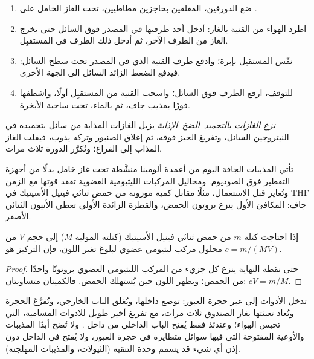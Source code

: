 \begin{method}\label{met:b3:lab-techniques-3:cannula}
\begin{enumerate}
  \item ضع الدورقين، المغلقين بحاجزين مطاطيين، تحت الغاز الخامل على .
  \item اطرد الهواء من القنية بالغاز: أدخل أحد طرفيها في المصدر فوق السائل
        حتى يخرج الغاز من الطرف الآخر، ثم أدخل ذلك الطرف في المستقبِل.
  \item نفّس المستقبِل بإبرة؛ وادفع طرف القنية الذي في المصدر تحت
        سطح السائل: فيدفع الضغط الزائد السائل إلى الجهة الأخرى.
  \item للتوقف، ارفع الطرف فوق السائل؛ واسحب القنية من المستقبِل
        أولًا، واشطفها فورًا بمذيب جاف، ثم بالماء، تحت ساحبة الأبخرة.
\end{enumerate}
\end{method}

\begin{definition}\label{def:b3:lab-techniques-3:degassing}
\emph{نزع الغازات بالتجميد--الضخ--الإذابة} يزيل
الغازات المذابة من سائل بتجميده في النيتروجين السائل، وتفريغ
الحيز فوقه، ثم إغلاق الصنبور وتركه يذوب، فيفلت الغاز المذاب
إلى الفراغ؛ وتُكرَّر الدورة ثلاث مرات.
\end{definition}

تأتي المذيبات الجافة اليوم من أعمدة ألومينا منشَّطة تحت غاز خامل
بدلًا من أجهزة التقطير فوق الصوديوم. ومحاليل المركبات الليثيومية العضوية تفقد قوتها مع
الزمن وتُعاير قبل الاستعمال، مثلًا مقابل كمية موزونة من
حمض ثنائي فينيل الأسيتيك في THF جاف: المكافئ الأول ينزع بروتون الحمض، 
والقطرة الزائدة الأولى تعطي الأنيون الثنائي الأصفر.

\begin{proposition}\label{prop:b3:lab-techniques-3:titre}
إذا احتاجت كتلة $m$ من حمض ثنائي فينيل الأسيتيك (كتلته المولية $M$) إلى حجم $V$ من
محلول مركب ليثيومي عضوي لبلوغ تغير اللون، فإن التركيز هو $c = m/(MV)$.
\end{proposition}

\begin{proof}
حتى نقطة النهاية ينزع كل جزيء من المركب الليثيومي العضوي بروتونًا واحدًا من الحمض؛ 
ويظهر اللون حين يُستهلك الحمض. فالكميتان متساويتان: $cV = m/M$.
\end{proof}

\begin{inthelab}
تدخل الأدوات إلى  عبر حجرة العبور: توضع داخلها، ويُغلق
الباب الخارجي، وتُفرَّغ الحجرة وتُعاد تعبئتها بغاز الصندوق
ثلاث مرات، مع تفريغ أخير طويل للأدوات المسامية، التي تحبس الهواء؛
وعندئذ فقط يُفتح الباب الداخلي من داخل . ولا تُضخ أبدًا المذيبات
والأوعية المفتوحة التي فيها سوائل متطايرة في حجرة العبور، ولا
يُفتح في الداخل دون إذن أي شيء قد يسمم وحدة التنقية (الثيولات، والمذيبات المهلجنة).
\end{inthelab}

